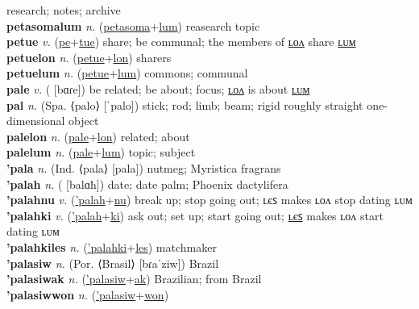 research; notes; archive \label{petasomalon} \\
\textbf{petasomalum} \textit{n.} (\hyperref[petasoma]{petasoma}+\hyperref[lum]{lum})
reasearch topic \label{petasomalum} \\
\textbf{petue} \textit{v.} (\hyperref[pe]{pe}+\hyperref[tue]{tue})
share; be communal; the members of \hyperref[petuelon]{ʟᴏᴧ} share \hyperref[petuelum]{ʟᴜᴍ} \label{petue} \\
\textbf{petuelon} \textit{n.} (\hyperref[petue]{petue}+\hyperref[lon]{lon})
sharers \label{petuelon} \\
\textbf{petuelum} \textit{n.} (\hyperref[petue]{petue}+\hyperref[lum]{lum})
commons; communal \label{petuelum} \\
\textbf{pale} \textit{v.} ( [bɑɾe])
be related; be about; focus; \hyperref[palelon]{ʟᴏᴧ} is about \hyperref[palelum]{ʟᴜᴍ} \label{pale} \\
\textbf{pal} \textit{n.} (Spa. ⟨palo⟩ [ˈpalo])
stick; rod; limb; beam; rigid roughly straight one-dimensional object \label{pal} \\
\textbf{palelon} \textit{n.} (\hyperref[pale]{pale}+\hyperref[lon]{lon})
related; about \label{palelon} \\
\textbf{palelum} \textit{n.} (\hyperref[pale]{pale}+\hyperref[lum]{lum})
topic; subject \label{palelum} \\
\textbf{'pala} \textit{n.} (Ind. ⟨pala⟩ [pala])
nutmeg; Myristica fragrans \label{'pala} \\
\textbf{'palah} \textit{n.} ( [balɑħ])
date; date palm; Phoenix dactylifera \label{'palah} \\
\textbf{'palahnu} \textit{v.} (\hyperref['palah]{'palah}+\hyperref[nu]{nu})
break up; stop going out; ʟєꜱ makes ʟᴏᴧ stop dating ʟᴜᴍ \label{'palahnu} \\
\textbf{'palahki} \textit{v.} (\hyperref['palah]{'palah}+\hyperref[ki]{ki})
ask out; set up; start going out; \hyperref['palahkiles]{ʟєꜱ} makes ʟᴏᴧ start dating ʟᴜᴍ \label{'palahki} \\
\textbf{'palahkiles} \textit{n.} (\hyperref['palahki]{'palahki}+\hyperref[les]{les})
matchmaker \label{'palahkiles} \\
\textbf{'palasiw} \textit{n.} (Por. ⟨Brasil⟩ [bɾaˈziw])
Brazil \label{'palasiw} \\
\textbf{'palasiwak} \textit{n.} (\hyperref['palasiw]{'palasiw}+\hyperref[ak]{ak})
Brazilian; from Brazil \label{'palasiwak} \\
\textbf{'palasiwwon} \textit{n.} (\hyperref['palasiw]{'palasiw}+\hyperref[won]{won})
